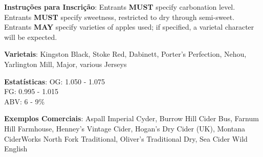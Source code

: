 \textbf{Instruções para Inscrição}: Entrants \textbf{MUST} specify carbonation level. Entrants \textbf{MUST} specify sweetness, restricted to dry through semi-sweet. Entrants \textbf{MAY} specify varieties of apples used; if specified, a varietal character will be expected.

\textbf{Varietais}: Kingston Black, Stoke Red, Dabinett, Porter's Perfection, Nehou, Yarlington Mill, Major, various Jerseys

\textbf{Estatísticas}: OG: 1.050 - 1.075 \\
\phantom{ } \hspace{16.5mm} FG: 0.995 - 1.015 \\
\phantom{ } \hspace{16.5mm} ABV: 6 - 9\%

\textbf{Exemplos Comerciais}: Aspall Imperial Cyder, Burrow Hill Cider Bus, Farnum Hill Farmhouse, Henney's Vintage Cider, Hogan's Dry Cider (UK), Montana CiderWorks North Fork Traditional, Oliver's Traditional Dry, Sea Cider Wild English